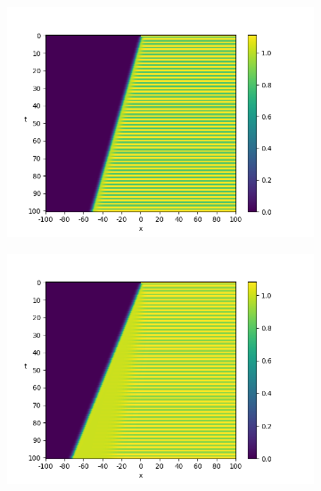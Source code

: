 \documentclass{article}
\theoremstyle{definition}
\numberwithin{equation}{section}
\begin{document}
\begin{figure}
\begin{subfigure}[b]{0.45\textwidth}
         \includegraphics[width=\textwidth]{figures/fig3a.png}
         \caption{}
     \end{subfigure}
     \begin{subfigure}[b]{0.45\textwidth}
         \centering
         \includegraphics[width=\textwidth]{figures/fig3d.png}
         \caption{}
     \end{subfigure}
     \begin{subfigure}[b]{0.45\textwidth}
      \centering

\end{subfigure}
\end{figure}
\end{document}
